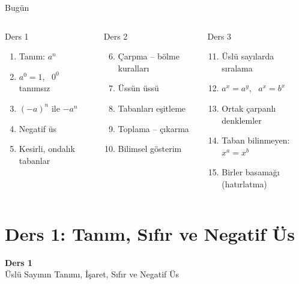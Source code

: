 \documentclass[aspectratio=169,11pt,handout]{beamer}
\begin{document}
\begin{frame}{Bugün}
\begin{columns}[t]
\begin{block}{Ders 1}
\begin{enumerate}
\item Tanım: \(a^n\)
\item \(a^0=1\), \ \(0^0\) tanımsız
\item \((-a)^n\) ile \(-a^n\)
\item Negatif üs
\item Kesirli, ondalık tabanlar
\end{enumerate}
\end{block}
\begin{block}{Ders 2}
\begin{enumerate}\setcounter{enumi}{5}
\item Çarpma -- bölme kuralları
\item Üssün üssü
\item Tabanları eşitleme
\item Toplama -- çıkarma
\item Bilimsel gösterim
\end{enumerate}
\end{block}
\begin{block}{Ders 3}
\begin{enumerate}\setcounter{enumi}{10}
\item Üslü sayılarda sıralama
\item \(a^x=a^y\), \ \(a^x=b^x\)
\item Ortak çarpanlı denklemler
\item Taban bilinmeyen: \(x^a=x^b\)
\item Birler basamağı (hatırlatma)
\end{enumerate}
\end{block}
\end{columns}
\end{frame}

\section{Ders 1: Tanım, Sıfır ve Negatif Üs}
\begin{frame}
\centering\Large\color{anamavi}\textbf{Ders 1}\\[6pt]\normalsize Üslü Sayının Tanımı, İşaret, Sıfır ve Negatif Üs
\end{frame}
\end{document}
